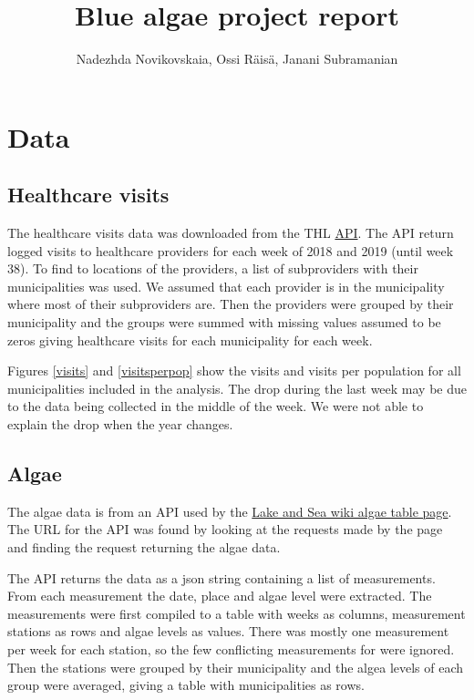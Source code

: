\documentclass[a4paper, 12pt, english]{article}
\title{Blue algae project report}
\author{Nadezhda Novikovskaia, Ossi Räisä, Janani Subramanian}
\begin{document}
\maketitle

\section{Data}

\subsection{Healthcare visits}
The healthcare visits data was downloaded from
the THL
\href{https://sampo.thl.fi/pivot/prod/fi/avopika/pikarap01/fact_ahil_pikarap01.csv?row=palveluntuottaja-349235L&column=viikko-349531L}{API}.
The API return logged visits to healthcare providers for each week
of 2018 and 2019 (until week 38). To find to locations of the providers,
a list of subproviders with their municipalities was used. We assumed
that each provider is in the municipality where most of their
subproviders are. Then the providers were grouped by their municipality
and the groups were summed with missing values assumed to be zeros
giving healthcare visits for each municipality for each week.

Figures \ref{visits} and \ref{visitsperpop} show the
visits and visits per population for all municipalities included
in the analysis. The drop during the last week may be
due to the data being collected in the middle of the week.
We were not able to explain the drop when the year changes.

\subsection{Algae}
The algae data is from an API used by the
\href{https://www.jarviwiki.fi/wiki/Toiminnot:Semanttinen_kysely/Lev%C3%A4taulukko}
{Lake and Sea wiki algae table page}.
The URL for the API was found by looking at the requests made by
the page and finding the request returning the algae data.

The API returns the data as a json string containing a list of
measurements. From each measurement the date, place and algae level were
extracted. The measurements were first compiled to a table with weeks
as columns, measurement stations as rows and algae levels as values.
There was mostly one measurement per week for each station, so the
few conflicting measurements for were ignored. Then the stations
were grouped by their municipality and the algea levels of each group
were averaged, giving a table with municipalities as rows.
\end{document}
